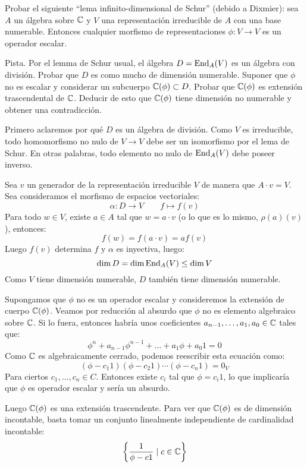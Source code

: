 \documentclass[twoside]{article}
\begin{document}
\newpage
\begin{ejercicio}{1.23}
Probar el siguiente ``lema infinito-dimensional de Schur'' (debido a Dixmier): sea $A$ un álgebra sobre $\mathbb{C}$ y $V$ una representación irreducible de $A$ con una base numerable. Entonces cualquier morfismo de representaciones $\phi:V\to V$ es un operador escalar.

Pista. Por el lemma de Schur usual, el álgebra $D=\operatorname{End}_A(V)$ es un álgebra con división. Probar que $D$ es como mucho de dimensión numerable. Suponer que $\phi$ no es escalar y considerar un subcuerpo $\mathbb{C}(\phi)\subset D$. Probar que $\mathbb{C}(\phi)$ es extensión trascendental de $\mathbb{C}$. Deducir de esto que $\mathbb{C}(\phi)$  tiene dimensión no numerable y obtener una contradicción.
\end{ejercicio}
\begin{solucion}
Primero aclaremos por qué $D$ es un álgebra de división.
Como $V$ es irreducible, todo homomorfismo no nulo de $V \to V$ debe ser un isomorfismo por el lema de Schur.
En otras palabras, todo elemento no nulo de $\operatorname{End}_A(V)$ debe poseer inverso.

Sea $v$ un generador de la representación irreducible $V$ de manera que $A \cdot v = V$.
Sea consideramos el morfismo de espacios vectoriales:
\[ \alpha : D \to V\qquad f \mapsto f(v) \]
Para todo $w \in V$, existe $a \in A$ tal que $w = a \cdot v$ (o lo que es lo mismo, $\rho(a)(v)$), entonces:
\[ f(w) = f(a\cdot v) = a f(v) \]
Luego $f(v)$ determina $f$ y $\alpha$ es inyectiva, luego:
\[ \dim D = \dim \operatorname{End}_A(V) \leq \dim V \]
Como $V$ tiene dimensión numerable, $D$ también tiene dimensión numerable.

Supongamos que $\phi$ no es un operador escalar y consideremos la extensión de cuerpo $\mathbb{C}(\phi)$.
Veamos por reducción al absurdo que $\phi$ no es elemento algebraico sobre $\mathbb{C}$.
Si lo fuera, entonces habría unos coeficientes $a_{n-1},\dots,a_1,a_0 \in \mathbb{C}$ tales que:
\[ \phi^n + a_{n-1}\phi^{n-1} + \dots + a_1 \phi + a_0 1 = 0 \]
Como $\mathbb{C}$ es algebraicamente cerrado, podemos reescribir esta ecuación como:
\[ (\phi-c_1 1)(\phi-c_2 1) \cdots (\phi-c_n 1) = 0_V \]
Para ciertos $c_1,\dots,c_n \in C$.
Entonces existe $c_i$ tal que $\phi = c_i 1$, lo que implicaría que $\phi$ es operador escalar y sería un absurdo.

Luego $\mathbb{C}(\phi)$ es una extensión trascendente.
Para ver que $\mathbb{C}(\phi)$ es de dimensión incontable, basta tomar un conjunto linealmente independiente de cardinalidad incontable:
\[ \left\{\frac{1}{\phi - c 1} \mid c \in \mathbb{C}\right\} \]


\end{solucion}
\end{document}
